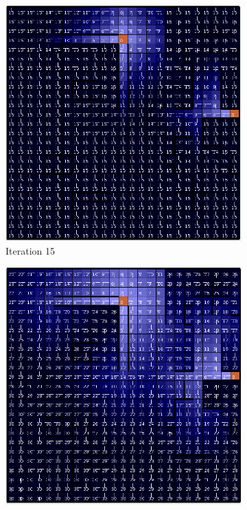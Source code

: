 \documentclass[letterpaper]{article}
\begin{document}
	\begin{figure}
		\centering
		\begin{subfigure}{.3\textwidth}
			\centering
			\includegraphics[width=\linewidth]{images/big_vi_15}
			\caption{Iteration 15}
		\end{subfigure}
		\begin{subfigure}{.3\textwidth}
			\centering
			\includegraphics[width=\linewidth]{images/big_vi_30}

\end{subfigure}
\end{figure}
\end{document}
